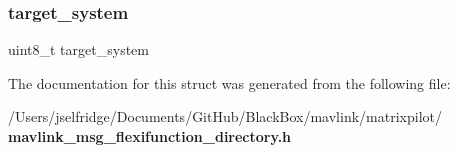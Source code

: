 \subsubsection{target\+\_\+system}
{\footnotesize\ttfamily uint8\+\_\+t target\+\_\+system}



The documentation for this struct was generated from the following file\+:\begin{DoxyCompactItemize}
\item 
/\+Users/jselfridge/\+Documents/\+Git\+Hub/\+Black\+Box/mavlink/matrixpilot/\textbf{ mavlink\+\_\+msg\+\_\+flexifunction\+\_\+directory.\+h}\end{DoxyCompactItemize}
